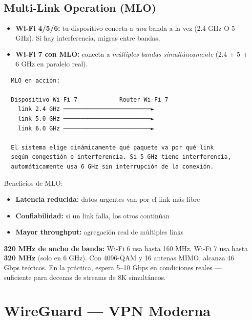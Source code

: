 \subsection{Multi-Link Operation (MLO)}

\begin{itemize}
    \item \textbf{Wi-Fi 4/5/6:} tu dispositivo conecta a \textit{una} banda a la vez
          (2.4 GHz O 5 GHz). Si hay interferencia, migras entre bandas.
    \item \textbf{Wi-Fi 7 con MLO:} conecta a \textit{múltiples bandas simultáneamente}
          (2.4 + 5 + 6 GHz en paralelo real).
\end{itemize}

\begin{lstlisting}
  MLO en acción:

  Dispositivo Wi-Fi 7            Router Wi-Fi 7
    link 2.4 GHz ─────────────────────────►
    link 5.0 GHz ─────────────────────────►
    link 6.0 GHz ─────────────────────────►

  El sistema elige dinámicamente qué paquete va por qué link
  según congestión e interferencia. Si 5 GHz tiene interferencia,
  automáticamente usa 6 GHz sin interrupción de la conexión.
\end{lstlisting}

Beneficios de MLO:
\begin{itemize}
    \item \textbf{Latencia reducida:} datos urgentes van por el link más libre
    \item \textbf{Confiabilidad:} si un link falla, los otros continúan
    \item \textbf{Mayor throughput:} agregación real de múltiples links
\end{itemize}

\begin{moderno}
\textbf{ 320 MHz de ancho de banda:} Wi-Fi 6 usa hasta 160 MHz.
Wi-Fi 7 usa hasta \textbf{320 MHz} (solo en 6 GHz). Con 4096-QAM y
16 antenas MIMO, alcanza 46 Gbps teóricos. En la práctica, espera
5--10 Gbps en condiciones reales --- suficiente para decenas de streams
de 8K simultáneos.
\end{moderno}

\section{ WireGuard --- VPN Moderna}

